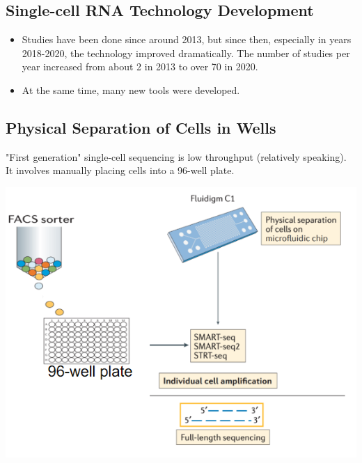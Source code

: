 \documentclass[10pt]{article}
\begin{document}
\subsection*{Single-cell RNA Technology Development}
\begin{itemize}
    \item Studies have been done since around 2013, but since then, especially in years 2018-2020, the technology improved dramatically.  The number of studies per year increased from about 2 in 2013 to over 70 in 2020.
    \item At the same time, many new tools were developed.
\end{itemize}

\subsection*{Physical Separation of Cells in Wells}
"First generation" single-cell sequencing is low throughput (relatively speaking).  It involves manually placing cells into a 96-well plate.
\begin{center}
    \includegraphics*[scale=1]{W7_1.png}
\end{center}    
\end{document}
